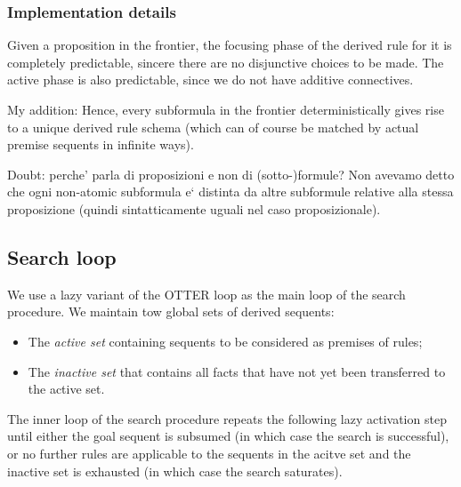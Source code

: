 \documentclass{article}
\begin{document}
\subsubsection{Implementation details}


Given a proposition in the frontier, the focusing phase of the derived rule for
it is completely predictable, sincere there are no disjunctive choices to be
made. The active phase is also predictable, since we do not have additive
connectives.

My addition: Hence, every subformula in the frontier deterministically gives
rise to a unique derived rule schema (which can of course be matched by actual
premise sequents in infinite ways).

Doubt: perche' parla di proposizioni e non di (sotto-)formule? Non avevamo detto
che ogni non-atomic subformula e` distinta da altre subformule relative alla
stessa proposizione (quindi sintatticamente uguali nel caso proposizionale).

\subsection{Search loop}


We use a lazy variant of the OTTER loop as the main loop of the search
procedure. We maintain tow global sets of derived sequents:

\begin{itemize}
\item The \emph{active set} containing sequents to be considered as premises of
  rules;
\item The \emph{inactive set} that contains all facts that have not yet been
  transferred to the active set.
\end{itemize}

The inner loop of the search procedure repeats the following lazy activation
step until either the goal sequent is subsumed (in which case the search is
successful), or no further rules are applicable to the sequents in the acitve
set and the inactive set is exhausted (in which case the search saturates).
\end{document}
